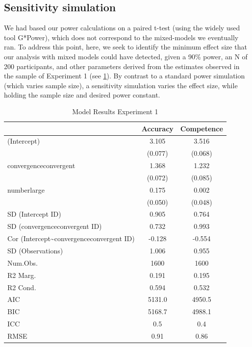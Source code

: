 \documentclass[
  doc,floatsintext]{apa6}
\begin{document}
\subsection{Sensitivity simulation}\label{sensitivity-simulation}

We had based our power calculations on a paired t-test (using the widely used tool G*Power), which does not correspond to the mixed-models we eventually ran. To address this point, here, we seek to identify the minimum effect size that our analysis with mixed models could have detected, given a 90\% power, an N of 200 participants, and other parameters derived from the estimates observed in the sample of Experiment 1 (see \ref{tab:exp1-regression-table}). By contrast to a standard power simulation (which varies sample size), a sensitivity simulation varies the effect size, while holding the sample size and desired power constant.

\begin{table}

\caption{\label{tab:exp1-regression-table}Model Results Experiment 1}
\centering
\begin{tabular}[t]{lcc}
\toprule
  & Accuracy & Competence\\
\midrule
(Intercept) & 3.105 & 3.516\\
 & (0.077) & (0.068)\\
convergenceconvergent & 1.368 & 1.232\\
 & (0.072) & (0.085)\\
numberlarge & 0.175 & 0.002\\
 & (0.050) & (0.048)\\
SD (Intercept ID) & 0.905 & 0.764\\
SD (convergenceconvergent ID) & 0.732 & 0.993\\
Cor (Intercept\textasciitilde{}convergenceconvergent ID) & -0.128 & -0.554\\
SD (Observations) & 1.006 & 0.955\\
\midrule
Num.Obs. & 1600 & 1600\\
R2 Marg. & 0.191 & 0.195\\
R2 Cond. & 0.594 & 0.532\\
AIC & 5131.0 & 4950.5\\
BIC & 5168.7 & 4988.1\\
ICC & 0.5 & 0.4\\
RMSE & 0.91 & 0.86\\
\bottomrule
\end{tabular}
\end{table}
\end{document}
